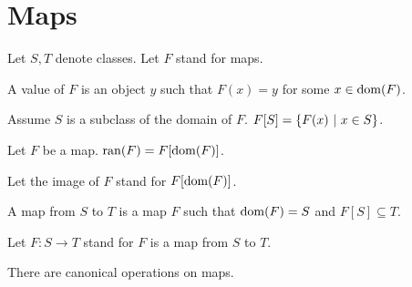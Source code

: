 \documentclass{article}
\newcommand{\range}{\operatorname{ran}}
\begin{document}
\section{Maps}
%
\begin{forthel}

Let $S, T$ denote classes.
Let $F$ stand for maps.

\begin{definition}
A value of $F$ is an object $y$ such
that $F(x) = y$ for some $x \in \operatorname{dom}(F)$.
\end{definition}


  \begin{definition}
    Assume $S$ is a subclass of the domain of $F$.
    $F[S] = \class{F(x) | x \in S}$.
  \end{definition}

\begin{definition}
Let $F$ be a map. $\range(F) = F[\dom(F)]$.
\end{definition}


  Let the image of $F$ stand for $F[\operatorname{dom}(F)]$.

\begin{definition}
    A map from $S$ to $T$ is a map $F$ such that $\operatorname{dom}(F) = S$
and $F[S]  \subseteq T$.
  \end{definition}

Let $F : S \rightarrow T$ stand for $F$ is a map from $S$ to $T$.
%
\end{forthel}
%
There are canonical operations on maps.
%
\end{document}
